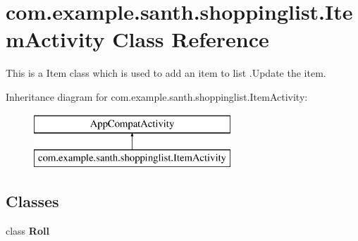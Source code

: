\hypertarget{classcom_1_1example_1_1santh_1_1shoppinglist_1_1_item_activity}{}\section{com.\+example.\+santh.\+shoppinglist.\+Item\+Activity Class Reference}
\label{classcom_1_1example_1_1santh_1_1shoppinglist_1_1_item_activity}


This is a Item class which is used to add an item to list .Update the item.  


Inheritance diagram for com.\+example.\+santh.\+shoppinglist.\+Item\+Activity\+:\begin{figure}[H]
\begin{center}
\leavevmode
\includegraphics[height=2.000000cm]{classcom_1_1example_1_1santh_1_1shoppinglist_1_1_item_activity}
\end{center}
\end{figure}
\subsection*{Classes}
\begin{DoxyCompactItemize}
\item 
class {\bfseries Roll}
\end{DoxyCompactItemize}
